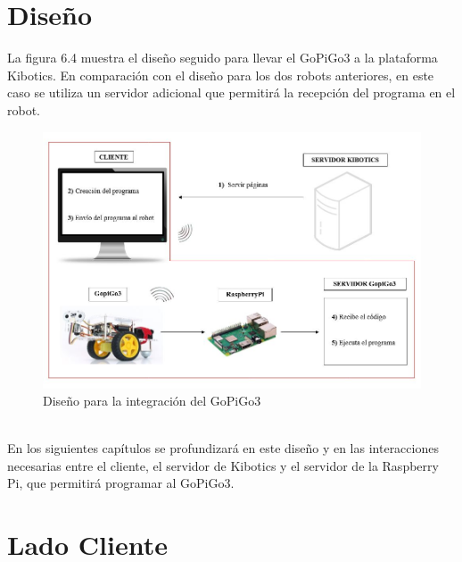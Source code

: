 \documentclass{report}
\begin{document}
\section{Diseño}

La figura 6.4 muestra el diseño seguido para llevar el GoPiGo3 a la plataforma Kibotics. En comparación con el diseño para los dos robots anteriores, en este caso se utiliza un servidor adicional que permitirá la recepción del programa en el robot.
\\
\begin{figure}[h!]
  \centering
    \includegraphics[width=1\textwidth]{images/arquitectura_GoPiGo.png}
  \caption{Diseño para la integración del GoPiGo3}
  \label{Diseño para la integración del GoPiGo3}
\end{figure}
\\
En los siguientes capítulos se profundizará en este diseño y en las interacciones necesarias entre el cliente, el servidor de Kibotics y el servidor de la Raspberry Pi, que permitirá programar al GoPiGo3.

\section{Lado Cliente}
\end{document}
